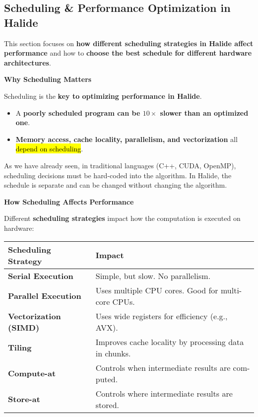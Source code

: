 \subsection{Scheduling \& Performance Optimization in Halide}

This section focuses on \textbf{how different scheduling strategies in Halide affect performance} and how to \textbf{choose the best schedule for different hardware architectures}.

\highspace
\begin{flushleft}
    \textcolor{Green3}{ \textbf{Why Scheduling Matters}}
\end{flushleft}
Scheduling is the \textbf{key to optimizing performance in Halide}.
\begin{itemize}
    \item A \textbf{poorly scheduled program can be $10\times$ slower than an optimized one}.
    \item \textbf{Memory access, cache locality, parallelism, and vectorization} all \hl{depend on scheduling}.
\end{itemize}
As we have already seen, in traditional languages (C++, CUDA, OpenMP), scheduling decisions must be hard-coded into the algorithm. In Halide, the schedule is separate and can be changed without changing the algorithm.

\highspace
\begin{flushleft}
    \textcolor{Green3}{ \textbf{How Scheduling Affects Performance}}
\end{flushleft}
Different \textbf{scheduling strategies} impact how the computation is executed on hardware:
\begin{table}[!htp]
    \centering
    \begin{tabular}{@{} l p{20em} @{}}
        \toprule
        \textbf{Scheduling Strategy} & \textbf{Impact} \\
        \midrule
        \textbf{Serial Execution} & Simple, but slow. No parallelism. \\ [.5em]
        \textbf{Parallel Execution} & Uses multiple CPU cores. Good for multi-core CPUs. \\ [.5em]
        \textbf{Vectorization (SIMD)} & Uses wide registers for efficiency (e.g., AVX). \\ [.5em]
        \textbf{Tiling} & Improves cache locality by processing data in chunks. \\ [.5em]
        \textbf{Compute-at} & Controls when intermediate results are com-\break puted. \\ [.5em]
        \textbf{Store-at} & Controls where intermediate results are stored. \\
        \bottomrule
    \end{tabular}
\end{table}

